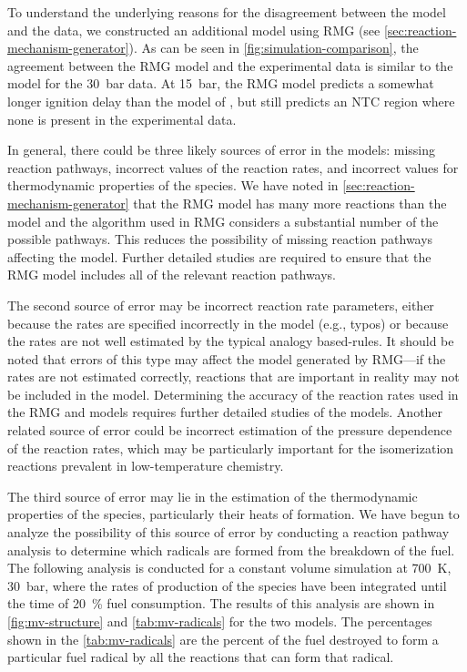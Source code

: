 \documentclass[letterpaper, review]{elsarticle}
\begin{document}
To understand the underlying reasons for the disagreement between the
\cite{Dievart2013} model and the data, we constructed an additional model
using RMG (see \cref{sec:reaction-mechanism-generator}). As can be seen in
\cref{fig:simulation-comparison}, the agreement between the RMG model and the
experimental data is similar to the \cite{Dievart2013} model for the
\SI{30}{\bar} data. At \SI{15}{\bar}, the RMG model predicts a somewhat longer
ignition delay than the model of \cite{Dievart2013}, but still predicts an
NTC region where none is present in the experimental data.

In general, there could be three likely sources of error in the models: missing
reaction pathways, incorrect values of the reaction rates, and incorrect values
for thermodynamic properties of the species. We have noted in
\cref{sec:reaction-mechanism-generator} that the RMG model has many more
reactions than the \cite{Dievart2013} model and the algorithm used in RMG
considers a substantial number of the possible pathways. This reduces the
possibility of missing reaction pathways affecting the model. Further detailed
studies are required to ensure that the RMG model includes all of the relevant
reaction pathways.

The second source of error may be incorrect reaction rate parameters, either
because the rates are specified incorrectly in the model (e.g., typos) or
because the rates are not well estimated by the typical analogy based-rules. It
should be noted that errors of this type may affect the model generated by
RMG---if the rates are not estimated correctly, reactions that are important in
reality may not be included in the model. Determining the accuracy of the
reaction rates used in the RMG and \cite{Dievart2013} models requires
further detailed studies of the models. Another related source of error could be
incorrect estimation of the pressure dependence of the reaction rates, which may
be particularly important for the isomerization reactions prevalent in
low-temperature chemistry.

The third source of error may lie in the estimation of the thermodynamic
properties of the species, particularly their heats of formation. We have begun
to analyze the possibility of this source of error by conducting a reaction
pathway analysis to determine which radicals are formed from the breakdown of
the fuel. The following analysis is conducted for a constant volume simulation
at \SI{700}{\K}, \SI{30}{\bar}, where the rates of production of the species
have been integrated until the time of \SI{20}{\percent} fuel consumption. The
results of this analysis are shown in \cref{fig:mv-structure} and
\cref{tab:mv-radicals} for the two models. The percentages shown in the
\cref{tab:mv-radicals} are the percent of the fuel destroyed to form a
particular fuel radical by all the reactions that can form that radical.
\end{document}
